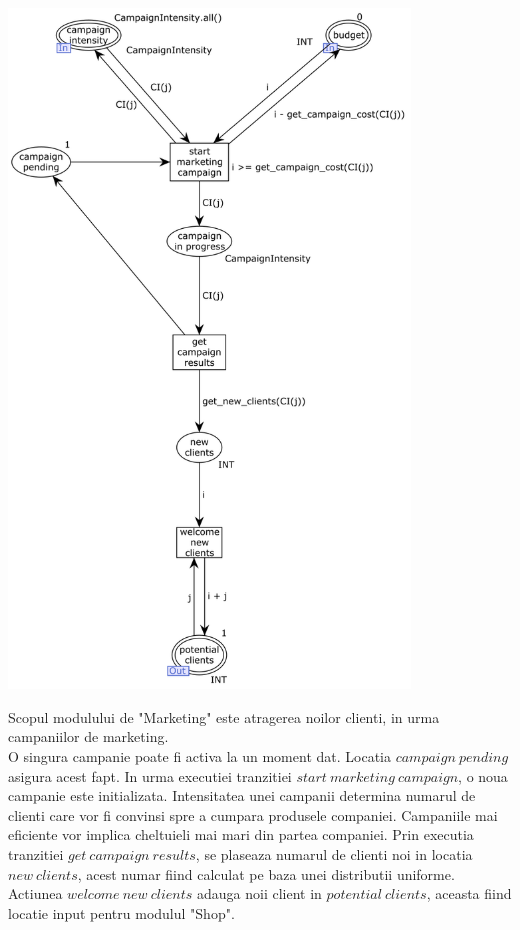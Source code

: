 \begin{spacing}{1.5}
\includegraphics[width=0.8\textwidth]{./Parts/Chapter1/Marketing.png}

Scopul modulului de "Marketing" este atragerea noilor clienti, in urma campaniilor de marketing.\\
O singura campanie poate fi activa la un moment dat. Locatia $campaign\ pending$ asigura acest fapt.
In urma executiei tranzitiei $start\ marketing\ campaign$, o noua campanie este initializata. Intensitatea
unei campanii determina numarul de clienti care vor fi convinsi spre a cumpara produsele companiei. Campaniile
mai eficiente vor implica cheltuieli mai mari din partea companiei.
Prin executia tranzitiei $get\ campaign\ results$, se plaseaza numarul de clienti noi in locatia $new\ clients$,
acest numar fiind calculat pe baza unei distributii uniforme. Actiunea $welcome\ new\ clients$ adauga noii
client in $potential\ clients$, aceasta fiind locatie input pentru modulul "Shop".

\end{spacing}
\newpage


